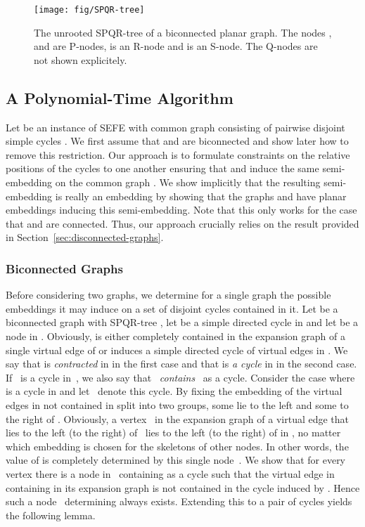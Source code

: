 \documentclass{scrartcl}
\newcommand{\1}[1]{{\normalfont \ensuremath{#1^{\tiny\circled{1}}}}} \newcommand{\2}[1]{{\normalfont \ensuremath{#1^{\tiny\circled{2}}}}} \renewcommand{\k}[1]{{\normalfont \ensuremath{#1^{\tiny\circled{k}}}}} \newcommand{\proj}[2]{\ensuremath{\left.#1\right|_{#2}}} \newcommand{\eps}{\varepsilon}
\theoremstyle{plain} \newtheorem{theorem}{Theorem} \newcounter{lemmacounter} \setcounter{lemmacounter}{0} \newtheorem{lemma}[lemmacounter]{Lemma} \newtheorem{fact}{Fact}  \newtheorem{corollary}{Corollary} \theoremstyle{definition} \newtheorem{definition}{Definition}
\begin{document}
\begin{figure}
  \centering
  \texttt{[image: fig/SPQR-tree]}
  \caption{The unrooted SPQR-tree of a biconnected planar graph.  The
    nodes ,  and  are P-nodes,  is an
    R-node and  is an S-node.  The Q-nodes are not shown
    explicitely.}
  \label{fig:spqr-tree}
\end{figure}

\subsection{A Polynomial-Time Algorithm}
\label{sec:disj-cycl-poly-time}

Let  be an instance of {\sc SEFE} with common graph 
consisting of pairwise disjoint simple cycles .  We first assume that  and  are biconnected
and show later how to remove this restriction.  Our approach is to
formulate constraints on the relative positions of the cycles to one
another ensuring that  and  induce the same semi-embedding
on the common graph .  We show implicitly that the resulting
semi-embedding is really an embedding by showing that the graphs 
and  have planar embeddings inducing this semi-embedding.  Note
that this only works for the case that  and  are connected.
Thus, our approach crucially relies on the result provided in
Section~\ref{sec:disconnected-graphs}.

\subsubsection*{Biconnected Graphs}
\label{sec:biconnected-graphs}

Before considering two graphs, we determine for a single graph the
possible embeddings it may induce on a set of disjoint cycles
contained in it.  Let  be a biconnected graph with
SPQR-tree , let  be a simple directed cycle in  and
let  be a node in .  Obviously,  is either
completely contained in the expansion graph of a single virtual edge
of  or  induces a simple directed cycle of virtual edges in
.  We say that  is \emph{contracted} in  in
the first case and that  is \emph{a cycle} in  in the
second case.
If~
is a cycle in~, we also say that~
\emph{contains}~ as a cycle.  Consider the case where  is a
cycle in  and let~ denote this cycle.  By fixing
the embedding of  the virtual edges in  not
contained in  split into two groups, some lie to the left and
some to the right of .  Obviously, a vertex~ in the expansion graph of a virtual edge that lies to the left
(to the right) of~ lies to the left (to the right) of  in
, no matter which embedding is chosen for the skeletons of other
nodes.  In other words, the value of  is completely
determined by this single node~.  We show that for every vertex
 there is a node  in~ containing  as a
cycle such that the virtual edge in  containing  in its
expansion graph is not contained in the cycle  induced by .
Hence such a node~ determining 
always exists.  Extending this to a pair of cycles yields the
following lemma.
\end{document}
